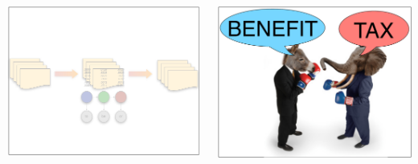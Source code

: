 \documentclass[compress]{beamer}
\begin{document}
\begin{frame}
\begin{columns}
  \end{columns}

  \begin{columns}
    \begin{center}
      \includegraphics[width=\linewidth]{cognitive/algorithms_off}
      \end{center}
    \begin{center}
      \includegraphics[width=\linewidth]{cognitive/framing_on}
      \end{center}
  \end{columns}



\end{frame}
\end{document}

